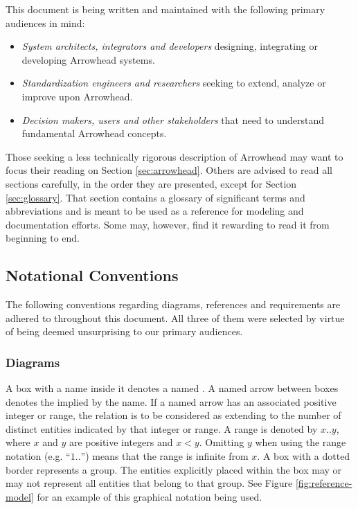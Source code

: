 This document is being written and maintained with the following primary audiences in mind:

\begin{itemize}
\item \textit{System architects, integrators and developers} designing, integrating or developing Arrowhead systems.
\item \textit{Standardization engineers and researchers} seeking to extend, analyze or improve upon Arrowhead.
\item \textit{Decision makers, users and other stakeholders} that need to understand fundamental Arrowhead concepts.
\end{itemize}

Those seeking a less technically rigorous description of Arrowhead may want to focus their reading on Section \ref{sec:arrowhead}.
Others are advised to read all sections carefully, in the order they are presented, except for Section \ref{sec:glossary}.
That section contains a glossary of significant terms and abbreviations and is meant to be used as a reference for modeling and documentation efforts.
Some may, however, find it rewarding to read it from beginning to end.

\subsection{Notational Conventions}
\label{sec:introduction:conventions}

The following conventions regarding diagrams, references and requirements are adhered to throughout this document.
All three of them were selected by virtue of being deemed unsurprising to our primary audiences.

\subsubsection{Diagrams}

A box with a name inside it denotes a named .
A named arrow between boxes denotes the  implied by the name.
If a named arrow has an associated positive integer or range, the relation is to be considered as extending to the number of distinct entities indicated by that integer or range.
A range is denoted by $x..y$, where $x$ and $y$ are positive integers and $x<y$.
Omitting $y$ when using the range notation (e.g. ``$1..$'') means that the range is infinite from $x$.
A box with a dotted border represents a group.
The entities explicitly placed within the box may or may not represent all entities that belong to that group.
See Figure \ref{fig:reference-model} for an example of this graphical notation being used.

